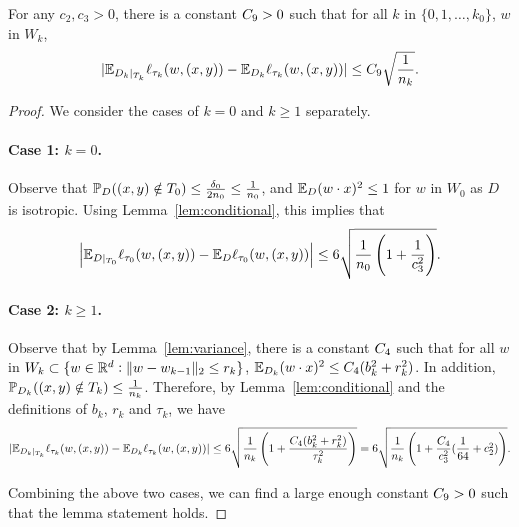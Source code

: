 \begin{lemma}
	For any $c_2, c_3 > 0$, there is a constant $\cn  > 0$ such that for all
	$k$ in $\{0,1,\ldots,k_0\}$, $w$ in $W_k$,
	\begin{equation*}
	|\E_{D_k|_{T_k}} \ell_{\tau_k}(w, (x, y)) - \E_{D_k} \ell_{\tau_k}(w, (x, y))| \leq \cn \sqrt{\frac{1}{n_k}}.
	\end{equation*}
	\label{lem:tk}
\end{lemma}
\begin{proof}
We consider the cases of $k = 0$ and $k \geq 1$ separately.
\paragraph{Case 1: $k = 0$.} Observe that $\P_{D}((x,y) \notin T_0) \leq \frac{\delta_0}{2n_0} \leq \frac{1}{n_0}$, and $\E_{D}(w \cdot x)^2 \leq 1$ for $w$ in $W_0$ as $D$ is isotropic.
Using Lemma~\ref{lem:conditional}, this implies that
\begin{equation*}
\left|\E_{D |_{T_0}} \ell_{\tau_0}(w, (x, y)) - \E_{D} \ell_{\tau_0}(w, (x, y)) \right| \leq 6\sqrt{\frac{1}{n_0}\left(1 + \frac{1}{c_3^2}\right)}.
\end{equation*}

\paragraph{Case 2: $k \geq 1$.} Observe that by Lemma~\ref{lem:variance}, there is a constant $\ce $ such that for all $w$ in $W_k \subset \{w \in \R^d: \| w - w_{k-1}\|_2 \leq r_k\}$,
$\E_{D_k}(w \cdot x)^2 \leq \ce  (b_k^2 + r_k^2)$. In addition, $\P_{D_k}((x,y) \notin T_k) \leq \frac 1 {n_k}$. Therefore, by Lemma~\ref{lem:conditional} and the definitions of $b_k$, $r_k$ and $\tau_k$, we have
\begin{equation*}
|\E_{D_k|_{T_k}} \ell_{\tau_k}(w, (x, y)) - \E_{D_k} \ell_{\tau_k}(w, (x, y))| \leq 6 \sqrt{\frac{1}{n_k} \left(1 + \frac{\ce (b_k^2 + r_k^2)}{\tau_k^2}\right)} = 6 \sqrt{\frac{1}{n_k} \left(1 + \frac{\ce}{c_3^2}(\frac 1 {64} + c_2^2)\right)}.
\end{equation*}

Combining the above two cases, we can find a large enough constant $\cn >0$ such that the lemma statement holds.
\end{proof}

